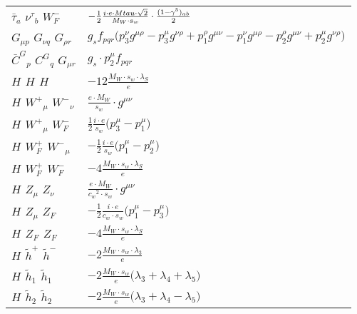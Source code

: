 \begin{center}
\begin{tabular}{|l|l|}
$\bar{\tau}{}_{a }$ \phantom{-} $\nu^\tau{}_{b }$ \phantom{-} $W^-_F{}_{}$ \phantom{-}  &
	$-\frac{1}{2}\frac{ i \cdot e \cdot Mtau \cdot\sqrt{2}}{ M_W \cdot s_w}\cdot {(1-\gamma^5)_{a b}\over 2} $\\[2mm]
${G}_{\mu p }$ \phantom{-} ${G}_{\nu q }$ \phantom{-} ${G}_{\rho r }$ \phantom{-}  &
	$ g_sf_{p q r} \big(p_3^\nu g^{\mu \rho} -p_3^\mu g^{\nu \rho} +p_1^\rho g^{\mu \nu} -p_1^\nu g^{\mu \rho} -p_2^\rho g^{\mu \nu} +p_2^\mu g^{\nu \rho} \big)$\\[2mm]
$\bar{C}^G{}_{p }$ \phantom{-} $C^G{}_{q }$ \phantom{-} ${G}_{\mu r }$ \phantom{-}  &
	$ g_s\cdot p_2^\mu f_{p q r} $\\[2mm]
${H}_{}$ \phantom{-} ${H}_{}$ \phantom{-} ${H}_{}$ \phantom{-}  &
	$-12\frac{ M_W \cdot s_w \cdot \lambda_S}{ e}$\\[2mm]
${H}_{}$ \phantom{-} $W^+{}_{\mu }$ \phantom{-} $W^-{}_{\nu }$ \phantom{-}  &
	$\frac{ e \cdot M_W}{ s_w}\cdot g^{\mu \nu} $\\[2mm]
${H}_{}$ \phantom{-} $W^+{}_{\mu }$ \phantom{-} $W^-_F{}_{}$ \phantom{-}  &
	$\frac{1}{2}\frac{ i \cdot e}{ s_w}\big(p_3^\mu -p_1^\mu \big)$\\[2mm]
${H}_{}$ \phantom{-} $W^+_F{}_{}$ \phantom{-} $W^-{}_{\mu }$ \phantom{-}  &
	$-\frac{1}{2}\frac{ i \cdot e}{ s_w}\big(p_1^\mu -p_2^\mu \big)$\\[2mm]
${H}_{}$ \phantom{-} $W^+_F{}_{}$ \phantom{-} $W^-_F{}_{}$ \phantom{-}  &
	$-4\frac{ M_W \cdot s_w \cdot \lambda_S}{ e}$\\[2mm]
${H}_{}$ \phantom{-} ${Z}_{\mu }$ \phantom{-} ${Z}_{\nu }$ \phantom{-}  &
	$\frac{ e \cdot M_W}{ c_w{}^2  \cdot s_w}\cdot g^{\mu \nu} $\\[2mm]
${H}_{}$ \phantom{-} ${Z}_{\mu }$ \phantom{-} $Z_F{}_{}$ \phantom{-}  &
	$-\frac{1}{2}\frac{ i \cdot e}{ c_w \cdot s_w}\big(p_1^\mu -p_3^\mu \big)$\\[2mm]
${H}_{}$ \phantom{-} $Z_F{}_{}$ \phantom{-} $Z_F{}_{}$ \phantom{-}  &
	$-4\frac{ M_W \cdot s_w \cdot \lambda_S}{ e}$\\[2mm]
${H}_{}$ \phantom{-} $\widetilde{h}^+{}_{}$ \phantom{-} $\widetilde{h}^-{}_{}$ \phantom{-}  &
	$-2\frac{ M_W \cdot s_w \cdot \lambda_3}{ e}$\\[2mm]
${H}_{}$ \phantom{-} $\widetilde{h}_1{}_{}$ \phantom{-} $\widetilde{h}_1{}_{}$ \phantom{-}  &
	$-2\frac{ M_W \cdot s_w}{ e}\big( \lambda_3+ \lambda_4+ \lambda_5\big)$\\[2mm]
${H}_{}$ \phantom{-} $\widetilde{h}_2{}_{}$ \phantom{-} $\widetilde{h}_2{}_{}$ \phantom{-}  &
	$-2\frac{ M_W \cdot s_w}{ e}\big( \lambda_3+ \lambda_4- \lambda_5\big)$\\ \hline
\end{tabular}


\end{center}
